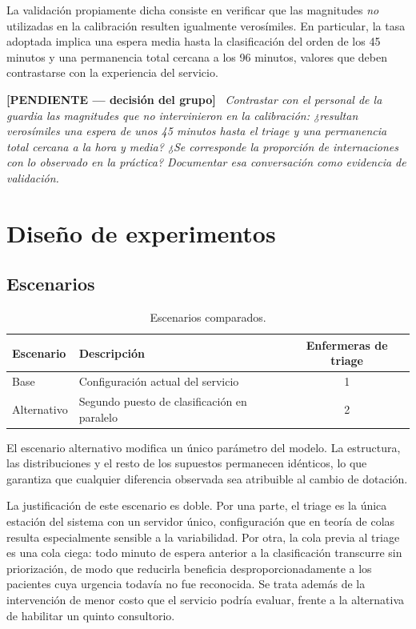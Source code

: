 \documentclass{article}
\newenvironment{pendiente}
  {\par\medskip\noindent\begingroup\color{red!65!black}%
   \textbf{[PENDIENTE — decisión del grupo]}\ \itshape}
  {\endgroup\par\medskip}
\begin{document}
La validación propiamente dicha consiste en verificar que las magnitudes
\emph{no} utilizadas en la calibración resulten igualmente verosímiles. En
particular, la tasa adoptada implica una espera media hasta la clasificación
del orden de los 45 minutos y una permanencia total cercana a los 96 minutos,
valores que deben contrastarse con la experiencia del servicio.

\begin{pendiente}
Contrastar con el personal de la guardia las magnitudes que no intervinieron
en la calibración: ¿resultan verosímiles una espera de unos 45 minutos hasta
el triage y una permanencia total cercana a la hora y media? ¿Se corresponde
la proporción de internaciones con lo observado en la práctica? Documentar esa
conversación como evidencia de validación.
\end{pendiente}

\section{Diseño de experimentos}
\label{sec:experimentos}

\subsection{Escenarios}

\begin{table}[H]
\centering
\begin{tabular}{llc}
\toprule
\textbf{Escenario} & \textbf{Descripción} & \textbf{Enfermeras de triage} \\
\midrule
Base        & Configuración actual del servicio & 1 \\
Alternativo & Segundo puesto de clasificación en paralelo & 2 \\
\bottomrule
\end{tabular}
\caption{Escenarios comparados.}
\end{table}

El escenario alternativo modifica un único parámetro del modelo. La
estructura, las distribuciones y el resto de los supuestos permanecen
idénticos, lo que garantiza que cualquier diferencia observada sea atribuible
al cambio de dotación.

La justificación de este escenario es doble. Por una parte, el triage es la
única estación del sistema con un servidor único, configuración que en teoría
de colas resulta especialmente sensible a la variabilidad. Por otra, la cola
previa al triage es una cola ciega: todo minuto de espera anterior a la
clasificación transcurre sin priorización, de modo que reducirla beneficia
desproporcionadamente a los pacientes cuya urgencia todavía no fue
reconocida. Se trata además de la intervención de menor costo que el servicio
podría evaluar, frente a la alternativa de habilitar un quinto consultorio.
\end{document}
